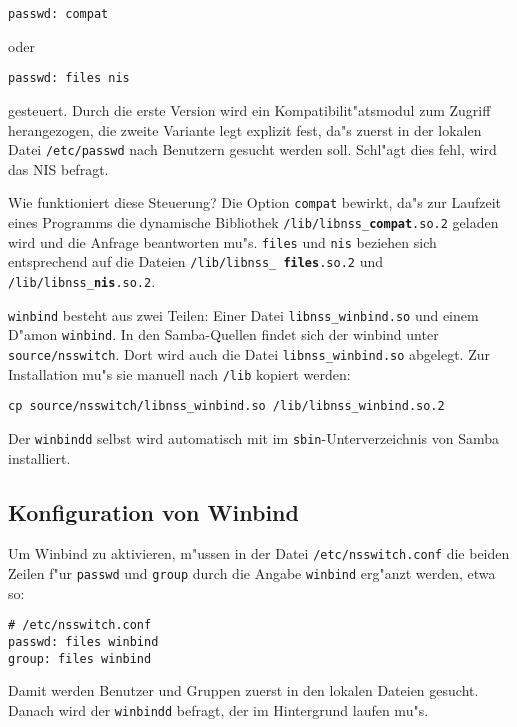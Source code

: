\documentclass{scrartcl}\usepackage{pslatex}\typearea{12}
\newcommand{\prog}{\texttt}
\newcommand{\param}{\texttt}
\newcommand{\dateistyle}{\texttt}
\begin{document}
\begin{verbatim}
passwd: compat
\end{verbatim}

\noindent oder

\begin{verbatim}
passwd: files nis
\end{verbatim}

\noindent gesteuert. Durch die erste Version wird ein
Kompatibilit"atsmodul zum Zugriff herangezogen, die zweite Variante
legt explizit fest, da"s zuerst in der lokalen Datei
\prog{/etc/passwd} nach Benutzern gesucht werden soll. Schl"agt dies
fehl, wird das NIS befragt.

Wie funktioniert diese Steuerung? Die Option \param{compat} bewirkt,
da"s zur Laufzeit eines Programms die dynamische Bibliothek
\dateistyle{/lib/libnss\_{\bfseries compat}.so.2} geladen wird und die
Anfrage beantworten mu"s. \param{files} und \param{nis} beziehen sich
entsprechend auf die Dateien \dateistyle{/lib/libnss\_{\bfseries
    files}.so.2} und \dateistyle{/lib/libnss\_{\bfseries nis}.so.2}.

\prog{winbind} besteht aus zwei Teilen: Einer Datei
\dateistyle{libnss\_winbind.so} und einem D"amon \prog{winbind}. In
den Samba-Quellen findet sich der winbind unter
\dateistyle{source/nsswitch}. Dort wird auch die Datei
\dateistyle{libnss\_winbind.so} abgelegt. Zur Installation mu"s sie
manuell nach \dateistyle{/lib} kopiert werden:

\begin{verbatim}
cp source/nsswitch/libnss_winbind.so /lib/libnss_winbind.so.2
\end{verbatim}

Der \prog{winbindd} selbst wird automatisch mit im
\dateistyle{sbin}-Unterverzeichnis von Samba installiert.

\subsection{Konfiguration von Winbind}

Um Winbind zu aktivieren, m"ussen in der Datei
\dateistyle{/etc/nsswitch.conf} die beiden Zeilen f"ur \param{passwd}
und \param{group} durch die Angabe \param{winbind} erg"anzt werden,
etwa so:

\begin{verbatim}
# /etc/nsswitch.conf
passwd: files winbind
group: files winbind
\end{verbatim}

Damit werden Benutzer und Gruppen zuerst in den lokalen Dateien
gesucht. Danach wird der \prog{winbindd} befragt, der im Hintergrund
laufen mu"s.
\end{document}
